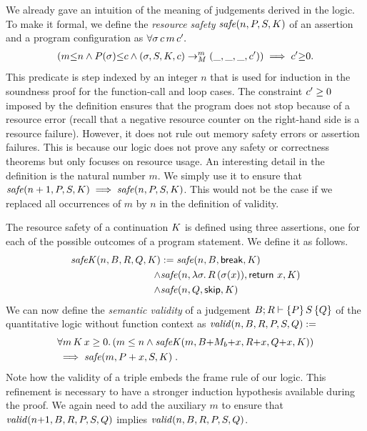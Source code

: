\documentclass[nocopyrightspace,preprint,pldi]{sigplanconf-pldi15}
\begin{document}
{We already gave an intuition of the meaning of judgements
derived in the logic.  To make it formal, we define the
\emph{resource safety} $\mathit{safe}(n,P,S,K)$ of an assertion
and a program configuration as $\forall \sigma \, c \, m \, c' .$
\begin{align*}
  (m {\le} n \land P(\sigma) {\le} c \land
    (\sigma, S, K, c) \to_{M}^m (\_, \_, \_, c'))
  \implies c' {\ge} 0.
\end{align*}
This predicate is step indexed by an integer $n$ that is used for
induction in the soundness proof for the function-call and loop cases.
The constraint $c' \geq 0$ imposed by the definition ensures that
the program does not stop because of a resource error (recall that a
negative resource counter on the right-hand side is a resource
failure).  However, it does not rule out memory safety errors or
assertion failures. This is because our logic does not prove any
safety or correctness theorems but only focuses on resource usage.
%
An interesting detail in the definition is the natural number $m$.  We
simply use it to ensure that $\mathit{safe}(n+1,P,S,K) \implies \mathit{safe}(n,P,S,K) $.  This would not be the case if we replaced all occurrences of
$m$ by $n$ in the definition of validity.

The resource safety of a continuation $K$ is defined using three
assertions, one for each of the possible outcomes of a program
statement.  We define it as follows.
\begin{align*}
\mathit{safeK}(n,B,R,Q,K) & :=  \mathit{safe}(n,B,\mathsf{break},K) \\
 \land& \mathit{safe}(n,\lambda \sigma.\,R\,(\sigma(x)),\mathsf{return}~x,K) \\
 \land& \mathit{safe}(n,Q,\mathsf{skip},K)
\end{align*}
%
We can now define the \emph{semantic validity} of a judgement $B; R
\vdash \{P\}\, S\, \{Q\}$ of the quantitative logic without function
context as $\mathit{valid}(n,B,R,P,S,Q) :=$
\begin{align*}
& \forall m \, K \, x \geq 0 .\, (m \le n \land \mathit{safeK}(m,B{+}M_b{+}x,R{+}x,Q{+}x,K)) \\
& \implies \mathit{safe}(m,P+x,S,K) \; .
\end{align*}
Note how the validity of a triple embeds the frame rule of
our logic. This refinement is necessary to have a stronger
induction hypothesis available during the proof.
%
We again need to add the auxiliary $m$ to ensure that $\mathit{valid}(n{+}1,B,R,P,S,Q)$ implies $\mathit{valid}(n,B,R,P,S,Q)$.

}
\end{document}
